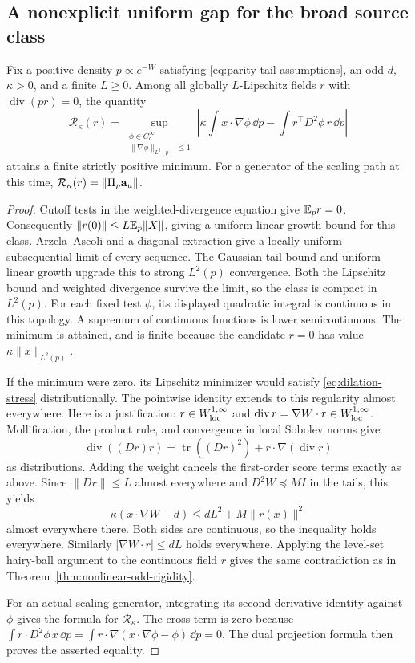 \subsection{A nonexplicit uniform gap for the broad source class}

\begin{proposition}
\label{prop:compact-odd-gap}
Fix a positive density $p\propto e^{-W}$ satisfying
\eqref{eq:parity-tail-assumptions}, an odd $d$, $\kappa>0$, and a finite
$L\ge0$.  Among all globally $L$-Lipschitz fields $r$ with
$\operatorname{div}(pr)=0$, the quantity
\[
 \mathcal R_\kappa(r)=
 \sup_{\substack{\phi\in C_c^\infty\\\|\nabla\phi\|_{L^2(p)}\le1}}
 \left|\kappa\int x\cdot\nabla\phi\,\dd p
       -\int r^\top D^2\phi\,r\,\dd p\right|
\]
attains a finite strictly positive minimum.  For a generator of the
scaling path at this time, $\mathcal R_\kappa(r)=\|\Pi_p\mathbf a_u\|$.
\end{proposition}

\begin{proof}
Cutoff tests in the weighted-divergence equation give $\mathbb E_pr=0$.
Consequently $\|r(0)\|\le L\mathbb E_p\|X\|$, giving a uniform linear-growth
bound for this class.  Arzela--Ascoli and a diagonal extraction give a
locally uniform subsequential limit of every sequence.  The Gaussian
tail bound and uniform linear growth upgrade this to strong $L^2(p)$
convergence.  Both the Lipschitz bound and weighted divergence survive
the limit, so the class is compact in $L^2(p)$.
For each fixed test $\phi$, its displayed quadratic integral is continuous
in this topology.  A supremum of continuous functions is lower
semicontinuous.  The minimum is attained, and is finite because the
candidate $r=0$ has value $\kappa\|x\|_{L^2(p)}$.

If the minimum were zero, its Lipschitz minimizer would satisfy
\eqref{eq:dilation-stress} distributionally.  The pointwise identity
extends to this regularity almost everywhere.  Here is a justification:
$r\in W^{1,\infty}_{\rm loc}$ and
$\operatorname{div}r=\nabla W\cdot r\in W^{1,\infty}_{\rm loc}$.
Mollification, the product rule, and convergence in local Sobolev norms
give
\[
 \operatorname{div}((Dr)r)
 =\operatorname{tr}((Dr)^2)+r\cdot\nabla(\operatorname{div}r)
\]
as distributions.  Adding the weight cancels the first-order score
terms exactly as above.  Since $\|Dr\|\le L$ almost everywhere and
$D^2W\preceq MI$ in the tails, this yields
\[
 \kappa(x\cdot\nabla W-d)\le dL^2+M\|r(x)\|^2
\]
almost everywhere there.  Both sides are continuous, so the inequality
holds everywhere.  Similarly
$|\nabla W\cdot r|\le dL$ holds everywhere.  Applying the level-set
hairy-ball argument to the continuous field $r$ gives the same
contradiction as in Theorem~\ref{thm:nonlinear-odd-rigidity}.

For an actual scaling generator, integrating its second-derivative
identity against $\phi$ gives the formula for $\mathcal R_\kappa$.
The cross term is zero because
$\int r\cdot D^2\phi\,x\,\dd p
=\int r\cdot\nabla(x\cdot\nabla\phi-\phi)\,\dd p=0$.
The dual projection formula then proves the asserted equality.
\end{proof}

